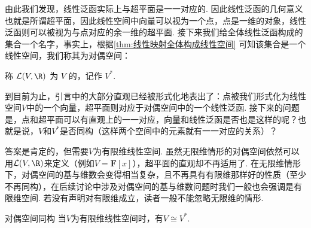由此我们发现，线性泛函实际上与超平面是一一对应的. 因此线性泛函的几何意义也就是所谓超平面，因此线性空间中向量可以视为一个点，点是一维的对象，线性泛函则可以被视为与点对应的余一维的超平面. 接下来我们给全体线性泛函构成的集合一个名字，事实上，根据\autoref{thm:线性映射全体构成线性空间} 可知该集合是一个线性空间，我们称其为对偶空间：
\begin{definition}{}{}
    称 $\mathcal{L}(V, \R)$ 为 $V$ 的，记作 $V^*$.
\end{definition}

到目前为止，引言中的大部分直观已经被形式化地表出了：点被我们形式化为线性空间$V$中的一个向量，超平面则对应于对偶空间中的一个线性泛函. 接下来的问题是，点和超平面可以有直观上的一一对应，向量和线性泛函是否也是这样的呢？也就是说，$V$和$V^*$是否同构（这样两个空间中的元素就有一一对应的关系）？

答案是肯定的，但需要$V$为有限维线性空间. 虽然无限维情形的对偶空间依然可以用$\mathcal{L}(V, \R)$来定义（例如$V=\mathbf{F}[x]$），超平面的直观却不再适用了. 在无限维情形下，对偶空间的基与维数会变得相当复杂，且不再具有有限维那样好的性质（至少不再同构），在后续讨论中涉及对偶空间的基与维数问题时我们一般也会强调是有限维空间. 若没有声明对有限维成立，读者一般不能忽略无限维的情形.

\begin{theorem}{}{对偶空间同构}
    当$V$为有限维线性空间时，有$V \cong V^*$.
\end{theorem}

